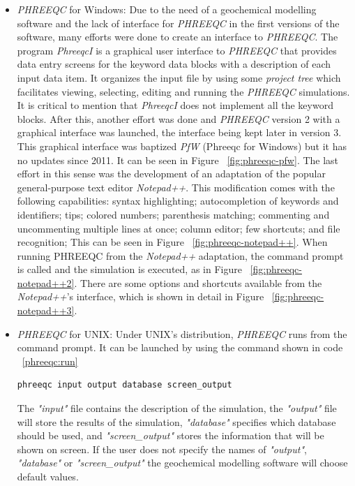 \begin{itemize}
\item \emph{PHREEQC} for Windows: Due to the need of a geochemical modelling software and the lack of interface for \emph{PHREEQC} in the first versions of the software, many efforts were done to create an interface to \emph{PHREEQC}. The program \emph{PhreeqcI} is a graphical user interface to \emph{PHREEQC} that provides data entry screens for the keyword data blocks with a description of each input data item. It organizes the input file by using some \emph{project tree} which facilitates viewing, selecting, editing and running the \emph{PHREEQC} simulations. It is critical to mention that \emph{PhreeqcI} does not implement all the keyword blocks. After this, another effort was done and \emph{PHREEQC} version 2 with a graphical interface was launched, the interface being kept later in version 3. This graphical interface was baptized \emph{PfW} (Phreeqc for Windows) but it has no updates since 2011. It can be seen in Figure ~\ref{fig:phreeqc-pfw}. The last effort in this sense was the development of an adaptation of the popular general-purpose text editor \emph{Notepad++}. This modification comes with the following capabilities: syntax highlighting; autocompletion of keywords and identifiers; tips; colored numbers; parenthesis matching; commenting and uncommenting multiple lines at once; column editor; few shortcuts; and file recognition; This can be seen in Figure ~\ref{fig:phreeqc-notepad++}. When running PHREEQC from the \emph{Notepad++} adaptation, the command prompt is called and the simulation is executed, as in Figure ~\ref{fig:phreeqc-notepad++2}. There are some options and shortcuts available from the \emph{Notepad++}'s interface, which is shown in detail in Figure ~\ref{fig:phreeqc-notepad++3}.
\item \emph{PHREEQC} for UNIX: Under UNIX's distribution, \emph{PHREEQC} runs from the command prompt. It can be launched by using the command shown in code ~\ref{phreeqc:run}
\begin{lstlisting}[frame=single, caption=Command to run UNIX's \emph{PHREEQC}, label=phreeqc:run]
phreeqc input output database screen_output
\end{lstlisting}
The \emph{"input"} file contains the description of the simulation, the \emph{"output"} file will store the results of the simulation, \emph{"database"} specifies which database should be used, and \emph{"screen\_output"} stores the information that will be shown on screen. If the user does not specify the names of \emph{"output"}, \emph{"database"} or \emph{"screen\_output"} the geochemical modelling software will choose default values.
\end{itemize}

